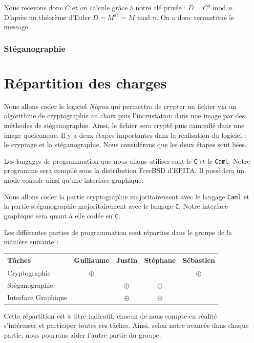 \documentclass[a4paper,12pt]{article}
\begin{document}
Nous recevons donc $C$ et on calcule grâce à notre clé privée : $D = C^{d} \textrm{ mod } n$. D'après un théorème d'Euler $D = M^{de} = M \textrm{ mod } n$. On a donc reconstitué le message.

\section{Stéganographie}

\newpage

\part{Répartition des charges}
Nous allons coder le logiciel \emph{Nigma} qui permettra de crypter un fichier via un algorithme de cryptographie au choix puis l'incrustation dans une image par des méthodes de stéganographie. Ainsi, le fichier sera crypté puis camouflé dans une image quelconque. Il y a deux étapes importantes dans la réalisation du logiciel : le cryptage et la stéganographie. Nous considérons que les deux étapes sont liées.

Les langages de programmation que nous allons utiliser sont le \texttt{C} et le \texttt{Caml}. Notre programme sera compilé sous la distribution FreeBSD d'EPITA. Il possèdera un mode console ainsi qu'une interface graphique.

Nous allons coder la partie cryptographie majoritairement avec le langage \texttt{Caml} et la partie stéganographie majoritairement avec le langage \texttt{C}. Notre interface graphique sera quant à elle codée en \texttt{C}.

Les différentes parties de programmation sont réparties dans le groupe de la manière suivante :

\begin{tabular}{|l|c|c|c|c|}
  \hline
  Tâches              & Guillaume & Justin   & Stéphane & Sébastien \\ \hline \hline
  Cryptographie       & $\oplus$  &          &          & $\oplus$   \\ \hline
  Stéganographie      &           & $\oplus$ & $\oplus$ &           \\ \hline
  Interface Graphique &           & $\oplus$ & $\oplus$ &           \\ \hline
\end{tabular}

Cette répartition est à titre indicatif, chacun de nous compte en réalité s'intéresser et participer toutes ces tâches. Ainsi, selon notre avancée dans chaque partie, nous pourrons aider l'autre partie du groupe.
\end{document}
